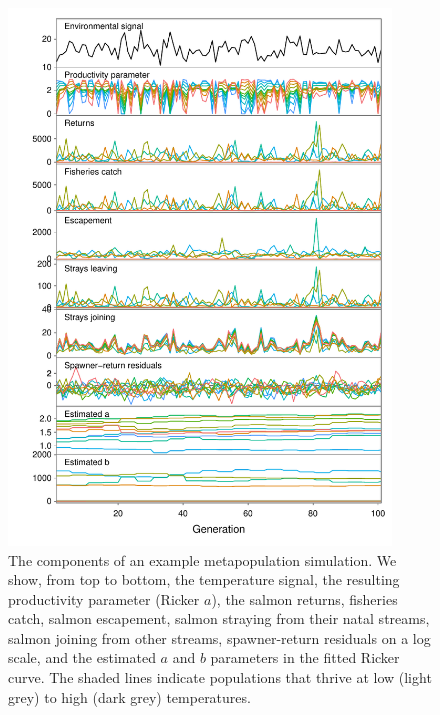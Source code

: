 \begin{figure}[htbp]
\centering
\includegraphics[width=4.0in]{metafolio/Fig3}
\caption{The components of an example metapopulation simulation. We show, from top to bottom, the temperature signal, the resulting productivity parameter (Ricker $a$), the salmon returns, fisheries catch, salmon escapement, salmon straying from their natal streams, salmon joining from other streams, spawner-return residuals on a log scale, and the estimated $a$ and $b$ parameters in the fitted Ricker curve. The shaded lines indicate populations that thrive at low (light grey) to high (dark grey) temperatures.} \label{f:ts}
\end{figure}

\clearpage

